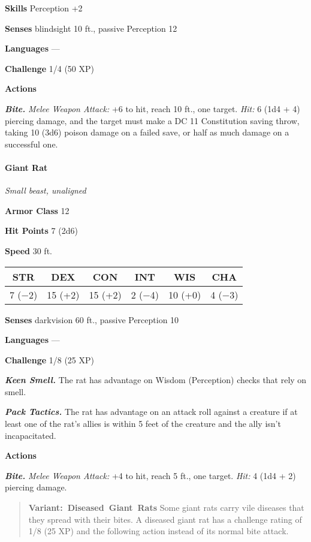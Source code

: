 \documentclass[
]{article}
\begin{document}
\textbf{Skills} Perception +2

\textbf{Senses} blindsight 10 ft., passive Perception 12

\textbf{Languages} ---

\textbf{Challenge} 1/4 (50 XP)

\textbf{Actions}

\emph{\textbf{Bite.}} \emph{Melee Weapon Attack:} +6 to hit, reach 10
ft., one target. \emph{Hit:} 6 (1d4 + 4) piercing damage, and the target
must make a DC 11 Constitution saving throw, taking 10 (3d6) poison
damage on a failed save, or half as much damage on a successful one.

\hypertarget{giant-rat}{%
\paragraph{Giant Rat}\label{giant-rat}}

\emph{Small beast, unaligned}

\textbf{Armor Class} 12

\textbf{Hit Points} 7 (2d6)

\textbf{Speed} 30 ft.

\begin{longtable}[]{@{}cccccc@{}}
\toprule
STR & DEX & CON & INT & WIS & CHA\tabularnewline
\midrule
\endhead
7 (−2) & 15 (+2) & 15 (+2) & 2 (−4) & 10 (+0) & 4 (−3)\tabularnewline
\bottomrule
\end{longtable}

\textbf{Senses} darkvision 60 ft., passive Perception 10

\textbf{Languages} ---

\textbf{Challenge} 1/8 (25 XP)

\emph{\textbf{Keen Smell.}} The rat has advantage on Wisdom (Perception)
checks that rely on smell.

\emph{\textbf{Pack Tactics.}} The rat has advantage on an attack roll
against a creature if at least one of the rat's allies is within 5 feet
of the creature and the ally isn't incapacitated.

\textbf{Actions}

\emph{\textbf{Bite.}} \emph{Melee Weapon Attack:} +4 to hit, reach 5
ft., one target. \emph{Hit:} 4 (1d4 + 2) piercing damage.

\begin{quote}
\textbf{Variant:~Diseased~Giant~Rats} Some giant rats carry vile
diseases that they spread with their bites. A diseased giant rat has a
challenge rating of 1/8 (25 XP) and the following action instead of its
normal bite attack.
\end{quote}
\end{document}
